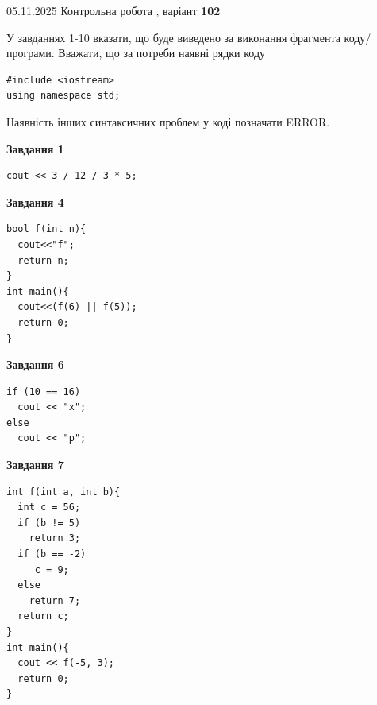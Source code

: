 \documentclass[12pt, ukrainian]{article}
\begin{document}
{\Large{05.11.2025 Контрольна робота , варіант  \No \textbf { 102 }\par}}
{
\begin {large}
У завданнях 1-10 вказати, що буде виведено за виконання фрагмента коду/про\-гра\-ми.
Вважати, що за потреби наявні рядки коду
\begin{verbatim}
#include <iostream>
using namespace std;
\end{verbatim}
Наявність інших синтаксичних проблем у коді позначати ERROR.

\begin{minipage}[t]{7.0cm}

\begin{center}
\textbf{Завдання 1}
\end{center}
\vspace{-8mm}

\begin{verbatim}
cout << 3 / 12 / 3 * 5;
\end{verbatim}



\begin{center}
\textbf{Завдання 4}
\end{center}
\vspace{-8mm}

\begin{verbatim}
bool f(int n){
  cout<<"f";
  return n;
}
int main(){
  cout<<(f(6) || f(5));
  return 0;
}
\end{verbatim}



\begin{center}
\textbf{Завдання 6}
\end{center}
\vspace{-8mm}

\begin{verbatim}
if (10 == 16)
  cout << "x";
else
  cout << "p";
\end{verbatim}



\begin{center}
\textbf{Завдання 7}
\end{center}
\vspace{-8mm}

\begin{verbatim}
int f(int a, int b){
  int c = 56;
  if (b != 5)
    return 3;
  if (b == -2)
     c = 9;
  else
    return 7;
  return c;
}
int main(){
  cout << f(-5, 3);
  return 0;
}
\end{verbatim}


\end{minipage}
\end{large}}
\end{document}
